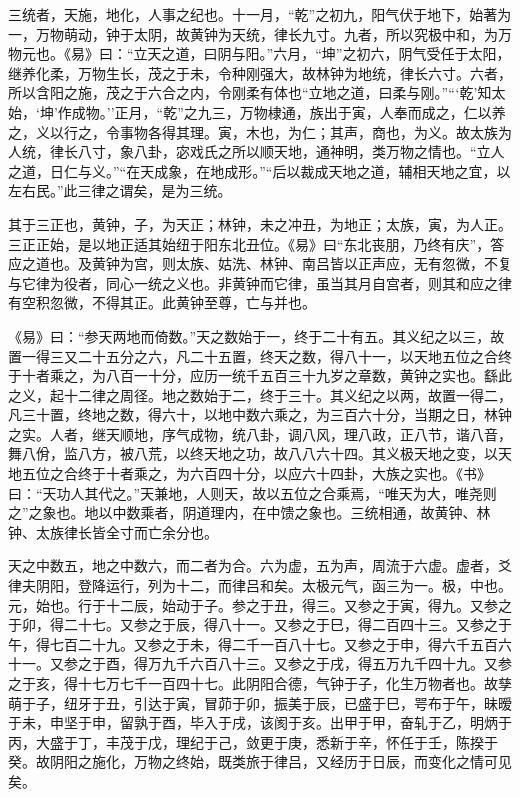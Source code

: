 \documentclass[]{article}
\begin{document}
三统者，天施，地化，人事之纪也。十一月，``乾''之初九，阳气伏于地下，始著为一，万物萌动，钟于太阴，故黄钟为天统，律长九寸。九者，所以究极中和，为万物元也。《易》曰：``立天之道，曰阴与阳。''六月，``坤''之初六，阴气受任于太阳，继养化柔，万物生长，茂之于未，令种刚强大，故林钟为地统，律长六寸。六者，所以含阳之施，茂之于六合之内，令刚柔有体也``立地之道，曰柔与刚。''```乾'知太始，`坤'作成物。''正月，``乾''之九三，万物棣通，族出于寅，人奉而成之，仁以养之，义以行之，令事物各得其理。寅，木也，为仁；其声，商也，为义。故太族为人统，律长八寸，象八卦，宓戏氏之所以顺天地，通神明，类万物之情也。``立人之道，日仁与义。''``在天成象，在地成形。''``后以裁成天地之道，辅相天地之宜，以左右民。''此三律之谓矣，是为三统。

其于三正也，黄钟，子，为天正；林钟，未之冲丑，为地正；太族，寅，为人正。三正正始，是以地正适其始纽于阳东北丑位。《易》曰``东北丧朋，乃终有庆''，答应之道也。及黄钟为宫，则太族、姑洗、林钟、南吕皆以正声应，无有忽微，不复与它律为役者，同心一统之义也。非黄钟而它律，虽当其月自宫者，则其和应之律有空积忽微，不得其正。此黄钟至尊，亡与并也。

《易》曰：``参天两地而倚数。''天之数始于一，终于二十有五。其义纪之以三，故置一得三又二十五分之六，凡二十五置，终天之数，得八十一，以天地五位之合终于十者乘之，为八百一十分，应历一统千五百三十九岁之章数，黄钟之实也。繇此之义，起十二律之周径。地之数始于二，终于三十。其义纪之以两，故置一得二，凡三十置，终地之数，得六十，以地中数六乘之，为三百六十分，当期之日，林钟之实。人者，继天顺地，序气成物，统八卦，调八风，理八政，正八节，谐八音，舞八佾，监八方，被八荒，以终天地之功，故八八六十四。其义极天地之变，以天地五位之合终于十者乘之，为六百四十分，以应六十四卦，大族之实也。《书》曰：``天功人其代之。''天兼地，人则天，故以五位之合乘焉，``唯天为大，唯尧则之''之象也。地以中数乘者，阴道理内，在中馈之象也。三统相通，故黄钟、林钟、太族律长皆全寸而亡余分也。

天之中数五，地之中数六，而二者为合。六为虚，五为声，周流于六虚。虚者，爻律夫阴阳，登降运行，列为十二，而律吕和矣。太极元气，函三为一。极，中也。元，始也。行于十二辰，始动于子。参之于丑，得三。又参之于寅，得九。又参之于卯，得二十七。又参之于辰，得八十一。又参之于巳，得二百四十三。又参之于午，得七百二十九。又参之于未，得二千一百八十七。又参之于申，得六千五百六十一。又参之于酉，得万九千六百八十三。又参之于戌，得五万九千四十九。又参之于亥，得十七万七千一百四十七。此阴阳合德，气钟于子，化生万物者也。故孳萌于子，纽牙于丑，引达于寅，冒茆于卯，振美于辰，已盛于巳，咢布于午，昧暧于未，申坚于申，留孰于酉，毕入于戌，该阂于亥。出甲于甲，奋轧于乙，明炳于丙，大盛于丁，丰茂于戊，理纪于己，敛更于庚，悉新于辛，怀任于壬，陈揆于癸。故阴阳之施化，万物之终始，既类旅于律吕，又经历于日辰，而变化之情可见矣。
\end{document}
